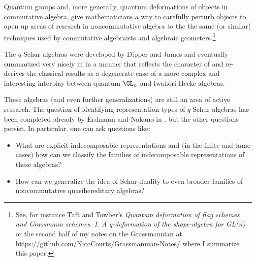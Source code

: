 \documentclass[12pt]{article}
\begin{document}
		Quantum groups and, more generally, quantum deformations of objects in commutative algebra, give mathematicians 
		a way to carefully perturb objects to open up areas of research in noncommutative algebra to the the same (or similar) techniques 
		used by commutative algebraists and algebraic geometers.\footnote{See, for instance Taft and Towber's \textit{Quantum deformation of flag schemes and Grassmann schemes. I. A q-deformation of the shape-algebra for GL(n)}
		or the second half of my notes on the Grassmannian at \href{https://github.com/NicoCourts/Grassmannian-Notes/}{https://github.com/NicoCourts/Grassmannian-Notes/} where I summarize this paper.} 

		The $q$-Schur algebras were developed by Dipper and James and eventually summarized very nicely in \cite{donkin-q-schur} in a manner that
		reflects the character of \cite{green} and re-derives the classical results as a degenerate case of a more complex and 
		interesting interplay between quantum $\GL_n$ and Iwahori-Hecke algebras.

		These algebras (and even further generalizations) are still an area of active research. The question of identifying representation 
		types of $q$-Schur algebras has been completed already by Erdmann and Nakano in \cite{erdmann-nakano}, 
		but the other questions persist. In particular, one can ask questions like:
		\begin{itemize}
			\item What are explicit indecomposable representations and (in the finite and tame cases) how can we classify the families of indecomposable representations of these algebras?
			\item How can we generalize the idea of Schur duality to even broader families of noncommutative quasihereditary algebras?
		\end{itemize}


\newpage

\printbibliography
{}
\end{document}
